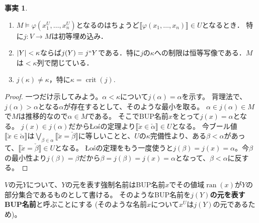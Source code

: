 \documentclass[uplatex,dvipdfmx]{jsarticle}
\newcommand{\range}{\operatorname{ran}}
\newcommand{\crit}{\operatorname{crit}}
\DeclarePairedDelimiter\abs{\lvert}{\rvert}
\newcommand{\truth}[1]{\llbracket #1 \rrbracket}
\theoremstyle{definition}
\newtheorem{fact}[thm]{事実}
\begin{document}
	\begin{fact}
	\begin{enumerate}
		\item $M \models \varphi(x_1^U, \dots, x_n^U)$となるのはちょうど$\truth{\varphi(x_1, \dots, x_n)} \in U$となるとき．
		特に$j \colon V \to M$は初等埋め込み．
		\item $\abs{Y} < \kappa$ならば$j(Y) = j``Y$である．特に$j$の$\kappa$への制限は恒等写像である．$M$は${<}\kappa$列で閉じている．
		\item $j(\kappa) \ne \kappa$，特に$\kappa = \crit(j)$.
	\end{enumerate}
	\end{fact}
	\begin{proof}
		一つだけ示してみよう。$\alpha < \kappa$について$j(\alpha) = \alpha$を示す。
		背理法で、$j(\alpha) > \alpha$となる$\alpha$が存在するとして、そのような最小を取る。
		$\alpha \in j(\alpha) \in M$で$M$は推移的なので$\alpha \in M$である。
		そこでBUP名前$x$をとって$j(x) = \alpha$となる。
		$j(x) \in j(\alpha)$だからŁośの定理より$\truth{\check{x} \in \check{\alpha}} \in U$となる。
		今ブール値$\truth{\check{x} \in \check{\alpha}}$は$\bigvee_{\beta \in \alpha} \truth{\check{x} = \check{\beta}}$に等しいことと、$U$の$\kappa$完備性より、ある$\beta < \alpha$があって、$\truth{\check{x} = \check{\beta}} \in U$となる。
		Łośの定理をもう一度使うと$j(\beta) = j(x) = \alpha$。今$\beta$の最小性より$j(\beta) = \beta$だから$\beta = j(\beta) = j(x) = \alpha$となって、$\beta < \alpha$に反する。
	\end{proof}

	$V$の元$Y$について、$Y$の元を表す強制名前はBUP名前$x$でその値域$\range(x)$が$Y$の部分集合であるものとして書ける。
	そのようなBUP名前を\textbf{$j(Y)$の元を表すBUP名前}と呼ぶことにする (そのような名前$x$について$x^U$は$j(Y)$の元であるため)。

	\nocite{*}
	\printbibliography[title={参考文献}]
\end{document}
